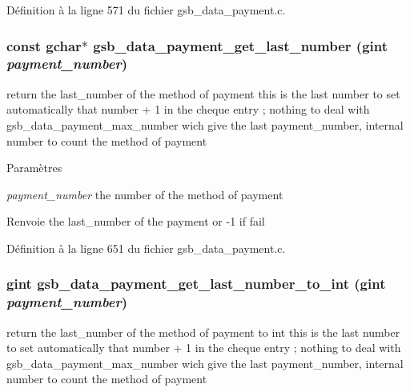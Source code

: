 Définition à la ligne 571 du fichier gsb\_\-data\_\-payment.c.

\subsubsection[{gsb\_\-data\_\-payment\_\-get\_\-last\_\-number}]{\setlength{\rightskip}{0pt plus 5cm}const gchar$\ast$ gsb\_\-data\_\-payment\_\-get\_\-last\_\-number (gint {\em payment\_\-number})}\label{gsb__data__payment_8h_a2e5d8517394a5d0685cfae13ff906f1b}
return the last\_\-number of the method of payment this is the last number to set automatically that number + 1 in the cheque entry ; nothing to deal with gsb\_\-data\_\-payment\_\-max\_\-number wich give the last payment\_\-number, internal number to count the method of payment


\begin{DoxyParams}{Paramètres}
\item[{\em payment\_\-number}]the number of the method of payment\end{DoxyParams}
\begin{DoxyReturn}{Renvoie}
the last\_\-number of the payment or -\/1 if fail 
\end{DoxyReturn}


Définition à la ligne 651 du fichier gsb\_\-data\_\-payment.c.

\subsubsection[{gsb\_\-data\_\-payment\_\-get\_\-last\_\-number\_\-to\_\-int}]{\setlength{\rightskip}{0pt plus 5cm}gint gsb\_\-data\_\-payment\_\-get\_\-last\_\-number\_\-to\_\-int (gint {\em payment\_\-number})}\label{gsb__data__payment_8h_a420ad8a019ad5a7f5578c17752339de9}
return the last\_\-number of the method of payment to int this is the last number to set automatically that number + 1 in the cheque entry ; nothing to deal with gsb\_\-data\_\-payment\_\-max\_\-number wich give the last payment\_\-number, internal number to count the method of payment



